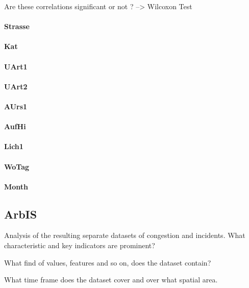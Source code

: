 \documentclass[a4paper,headsepline,footsepline,fontsize=11pt,BCOR=12mm,DIV=12]{report}
\begin{document}
Are these correlations significant or not ? --> Wilcoxon Test

\paragraph{Strasse}

\paragraph{Kat}

\paragraph{UArt1}

\paragraph{UArt2}

\paragraph{AUrs1}

\paragraph{AufHi}

\paragraph{Lich1}

\paragraph{WoTag}

\paragraph{Month}

\subsection{ArbIS}

Analysis of the resulting separate datasets of congestion and incidents. What characteristic and key indicators are prominent?

What find of values, features and so on, does the dataset contain?

What time frame does the dataset cover and over what spatial area.
\end{document}
